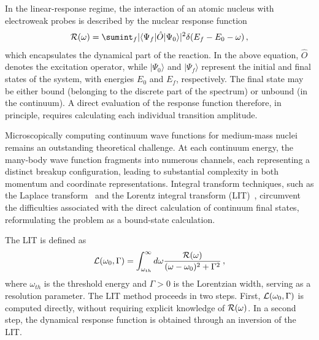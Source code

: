 In the linear-response regime, the interaction of an atomic nucleus with electroweak probes is described by the nuclear response function
\begin{equation}\label{eq:resp}
  {\cal R}(\omega)=\sumint_f |\langle\Psi_f | \hat O | \Psi_0 \rangle |^2 \delta{(E_f-E_0-\omega)} \,,
\end{equation}
which encapsulates the dynamical part of the reaction.
In the above equation, \( \hat O \) denotes the excitation operator, while
\( \lvert \Psi_0 \rangle \) and \( \lvert \Psi_f \rangle \) represent the initial and final
states of the system, with energies \( E_0 \) and \( E_f \), respectively.
The final state may be either bound (belonging to the discrete part of the spectrum)
or unbound (in the continuum).
A direct evaluation of the response function therefore, in principle,
requires calculating each individual transition amplitude.

Microscopically computing continuum wave functions for medium-mass nuclei remains an outstanding theoretical challenge. At each continuum energy, the many-body wave function fragments into numerous channels, each representing a distinct breakup configuration, leading to substantial complexity in both momentum and coordinate representations. Integral transform techniques, such as the Laplace transform~\cite{carlson_euclidean_1992} and the Lorentz integral transform (LIT)~\cite{efros_lorentz_2007}, circumvent the difficulties associated with the direct calculation of continuum final states, reformulating the problem as a bound-state calculation. 

The LIT is defined as
\begin{equation} \label{LIT}
  {\cal L}(\omega_0,\Gamma)=\int_{\omega_{th}}^\infty d\omega
  \frac{{\cal R}(\omega)}{(\omega-\omega_0)^2+\Gamma^2}\,,
\end{equation}
where \( \omega_{th} \) is the threshold energy and \( \Gamma>0 \) is the Lorentzian width, serving as a resolution parameter. The LIT method proceeds in two steps. First, \( {\cal L}(\omega_0,\Gamma) \) is computed directly, without requiring explicit knowledge of \( {\cal R}(\omega) \). In a second step, the dynamical response function is obtained through an inversion of the LIT.
 

